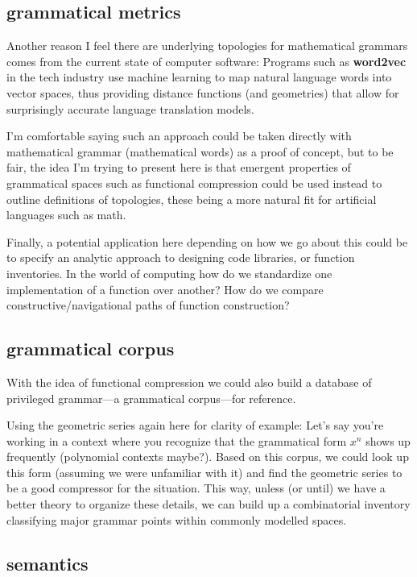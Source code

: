 \documentclass[twoside]{article}
\begin{document}
\subsection*{grammatical metrics}

Another reason I feel there are underlying topologies for mathematical grammars comes from the current state of computer
software: Programs such as {\bfseries word2vec} in the tech industry use machine learning to map natural language words
into vector spaces, thus providing distance functions (and geometries) that allow for surprisingly accurate language
translation models.

I'm comfortable saying such an approach could be taken directly with mathematical grammar (mathematical words)
as a proof of concept, but to be fair, the idea I'm trying to present here is that emergent properties of grammatical
spaces such as functional compression could be used instead to outline definitions of topologies, these
being a more natural fit for artificial languages such as math.

Finally, a potential application here depending on how we go about this could be to specify an analytic approach to
designing code libraries, or function inventories. In the world of computing how do we standardize one implementation
of a function over another? How do we compare constructive/navigational paths of function construction?

\subsection*{grammatical corpus}

With the idea of functional compression we could also build a database of privileged grammar---a grammatical
corpus---for reference.

Using the geometric series again here for clarity of example: Let's say you're working in a context where you
recognize that the grammatical form $ x^n $ shows up frequently (polynomial contexts maybe?). Based on this corpus,
we could look up this form (assuming we were unfamiliar with it) and find the geometric series to be a good compressor
for the situation. This way, unless (or until) we have a better theory to organize these details, we can build up
a combinatorial inventory classifying major grammar points within commonly modelled spaces.

\subsection*{semantics}
\end{document}
